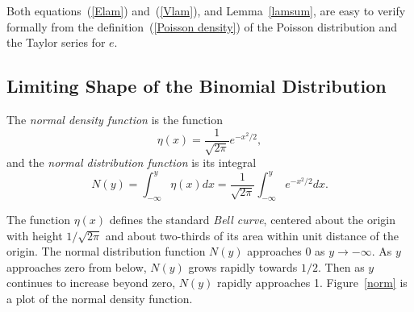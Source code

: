 \documentclass[11pt,twoside]{article}
\begin{document}
\begin{optional}
Both equations~(\ref{Elam}) and~(\ref{Vlam}), and Lemma~\ref{lamsum}, are
easy to verify formally from the definition~(\ref{Poisson density}) of the
Poisson distribution and the Taylor series for $e$.

\subsection{Limiting Shape of the Binomial Distribution}

\begin{definition}
The \emph{normal density function} is the function 
\[
\eta(x) = \frac{1}{\sqrt{2\pi}}e^{-x^2/2},
\]
and the \emph{normal distribution function} is its integral
\[
N(y) = \int_{-\infty}^y \eta(x)dx = \frac{1}{\sqrt{2\pi}}\int_{-\infty}^y
e^{-x^2/2}dx.
\]
\end{definition}

The function $\eta(x)$ defines the standard \emph{Bell curve}, centered
about the origin with height $1/\sqrt{2\pi}$ and about two-thirds of its
area within unit distance of the origin.  The normal distribution function
$N(y)$ approaches 0 as $y \rightarrow -\infty$.  As $y$ approaches zero
from below, $N(y)$ grows rapidly towards $1/2$.  Then as $y$ continues to
increase beyond zero, $N(y)$ rapidly approaches 1.  Figure~\ref{norm} is a
plot of the normal density function.


\end{optional}
\end{document}
